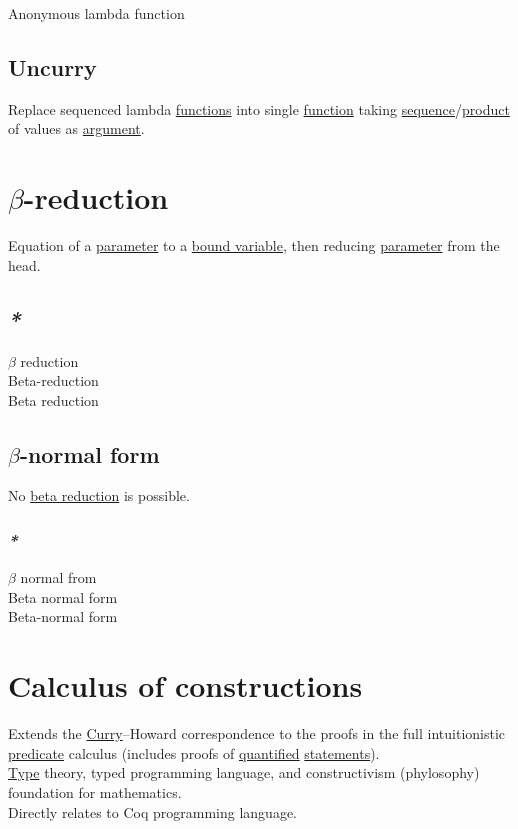 \documentclass[a4paper,14pt,oneside]{book}
\begin{document}
\label{org8badd43}Anonymous lambda function\\

\subsection{\label{org6cf3afe}Uncurry}
\label{sec:org6b2dc21}
Replace sequenced lambda \hyperref[org7c66ae8]{functions} into single \hyperref[org3864397]{function} taking \hyperref[orgab8429c]{sequence}/\hyperref[org0440d8e]{product} of values as \hyperref[org3a3491f]{argument}.\\

\section{\label{org0c4d1b3}\(\beta\)-reduction}
\label{sec:orgff50e19}
Equation of a \hyperref[orgbece9ff]{parameter} to a \hyperref[org5b0db48]{bound variable}, then reducing \hyperref[orgbece9ff]{parameter} from the head.\\

\subsection{\emph{*}}
\label{sec:org8bc0b86}

\label{orgd5d0f7c}\(\beta\) reduction\\
\label{org25834b5}Beta-reduction\\
\label{org1eb9241}Beta reduction\\

\subsection{\label{org0ae1155}\(\beta\)-normal form}
\label{sec:orgc8a1c6a}
No \hyperref[org1eb9241]{beta reduction} is possible.\\

\subsubsection{\emph{*}}
\label{sec:orgbbbb887}

\label{org7975475}\(\beta\) normal from\\
\label{orgb4d5304}Beta normal form\\
\label{org7484364}Beta-normal form\\

\section{\label{org180624b}Calculus of constructions}
\label{sec:orgb540875}
Extends the \hyperref[org29ccf33]{Curry}–Howard correspondence to the proofs in the full intuitionistic \hyperref[orga08337b]{predicate} calculus (includes proofs of \hyperref[orgd7c63bd]{quantified} \hyperref[orgcdbdabc]{statements}).\\
\hyperref[org9303510]{Type} theory, typed programming language, and constructivism (phylosophy) foundation for mathematics.\\
Directly relates to Coq programming language.\\
\end{document}
